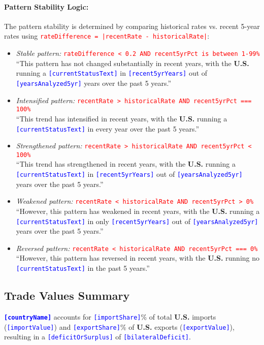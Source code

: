 \documentclass[12pt]{article}
\newcommand{\var}[1]{\textcolor{blue}{\texttt{[#1]}}}
\newcommand{\bold}[1]{\textbf{#1}}
\newcommand{\cond}[1]{\textcolor{red}{\texttt{#1}}}
\begin{document}
\paragraph{Pattern Stability Logic:}
The pattern stability is determined by comparing historical rates vs. recent 5-year rates using \cond{rateDifference = |recentRate - historicalRate|}:

\begin{itemize}[noitemsep]
\item \textit{Stable pattern:} \cond{rateDifference < 0.2 AND recent5yrPct is between 1-99\%}\\
``This pattern has not changed substantially in recent years, with the \bold{U.S.} running a \var{currentStatusText} in \var{recent5yrYears} out of \var{yearsAnalyzed5yr} years over the past 5 years.''

\item \textit{Intensified pattern:} \cond{recentRate > historicalRate AND recent5yrPct === 100\%}\\
``This trend has intensified in recent years, with the \bold{U.S.} running a \var{currentStatusText} in every year over the past 5 years.''

\item \textit{Strengthened pattern:} \cond{recentRate > historicalRate AND recent5yrPct < 100\%}\\
``This trend has strengthened in recent years, with the \bold{U.S.} running a \var{currentStatusText} in \var{recent5yrYears} out of \var{yearsAnalyzed5yr} years over the past 5 years.''

\item \textit{Weakened pattern:} \cond{recentRate < historicalRate AND recent5yrPct > 0\%}\\
``However, this pattern has weakened in recent years, with the \bold{U.S.} running a \var{currentStatusText} in only \var{recent5yrYears} out of \var{yearsAnalyzed5yr} years over the past 5 years.''

\item \textit{Reversed pattern:} \cond{recentRate < historicalRate AND recent5yrPct === 0\%}\\
``However, this pattern has reversed in recent years, with the \bold{U.S.} running no \var{currentStatusText} in the past 5 years.''
\end{itemize}

\subsection{Trade Values Summary}
\bold{\var{countryName}} accounts for \var{importShare}\% of total \bold{U.S.} imports (\var{importValue}) and \var{exportShare}\% of \bold{U.S.} exports (\var{exportValue}), resulting in a \var{deficitOrSurplus} of \var{bilateralDeficit}.
\end{document}
